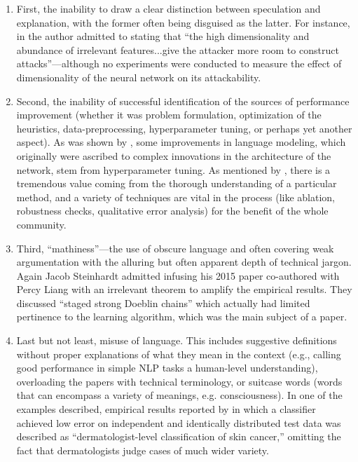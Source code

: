 \documentclass[preprint,12pt]{elsarticle}
\begin{document}
\begin{enumerate}
    \item First, the inability to draw a clear distinction between speculation and explanation, with the former often being disguised as the latter. For instance, in \citet{steinhardt2017certified} the author admitted to stating that “the high dimensionality and abundance of irrelevant features...give the attacker more room to construct attacks”---although no experiments were conducted to measure the effect of dimensionality of the neural network on its attackability.
    \item Second, the inability of successful identification of the sources of performance improvement (whether it was problem formulation, optimization of the heuristics, data-preprocessing, hyperparameter tuning, or perhaps yet another aspect). As was shown by \citet{melis2017state}, some improvements in language modeling, which originally were ascribed to complex innovations in the architecture of the network, stem from hyperparameter tuning. As mentioned by \citet{lipton2019troubling}, there is a tremendous value coming from the thorough understanding of a particular method, and a variety of techniques are vital in the process (like ablation, robustness checks, qualitative error analysis) for the benefit of the whole community.
    \item Third, “mathiness”---the use of obscure language and often covering weak argumentation with the alluring but often apparent depth of technical jargon. Again Jacob Steinhardt admitted infusing his 2015 paper co-authored with Percy Liang \citet{steinhardt2015learning} with an irrelevant theorem to amplify the empirical results. They discussed “staged strong Doeblin chains” which actually had limited pertinence to the learning algorithm, which was the main subject of a paper.
    \item Last but not least, misuse of language. This includes suggestive definitions without proper explanations of what they mean in the context (e.g., calling good performance in simple NLP tasks a human-level understanding), overloading the papers with technical terminology, or suitcase words (words that can encompass a variety of meanings, e.g. consciousness). In one of the examples described, empirical results reported by \citet{esteva_dermatologist-level_2017} in which a classifier achieved low error on independent and identically distributed test data was described as “dermatologist-level classification of skin cancer,” omitting the fact that dermatologists judge cases of much wider variety.
\end{enumerate}
\end{document}
